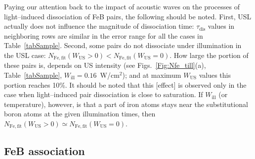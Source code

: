 \documentclass[%
 aip,jap,
 amsmath,amssymb,
 reprint,%
]{revtex4-1}
\begin{document}

Paying our attention back to the impact of acoustic waves on the processes of light--induced dissociation of FeB pairs, the following should be noted.
First,  USL actually does not influence the magnitude of dissociation time:
$\tau_\mathrm{dis}$ values in neighboring rows
are similar in the error range for all the cases in
Table~\ref{tabSample}.
Second, some pairs do not dissociate under illumination in the USL case:
$N_\mathrm{Fe,fit}(W_\mathrm{US}>0)< N_\mathrm{Fe,fit}(W_\mathrm{US}=0)$.
How large the portion of these pairs is, depends on US intensity
(see Figs.~\ref{Fig:Nfe_till}(a),
Table~\ref{tabSample},
$W_\mathrm{ill}=0.16$~W/cm$^2$);
and at maximum $W_\mathrm{US}$ values this portion reaches 10\%.
It should be noted that this [effect] is observed only in the case when light--induced pair dissociation is close to saturation.
If $W_\mathrm{ill}$ (or temperature), however, is that a part of iron atoms stays near the substitutional boron atoms at the given illumination times,
then $N_\mathrm{Fe,fit}(W_\mathrm{US}>0)\simeq N_\mathrm{Fe,fit}(W_\mathrm{US}=0)$.


\subsection{\label{sec:FeBass}FeB association}
\end{document}
